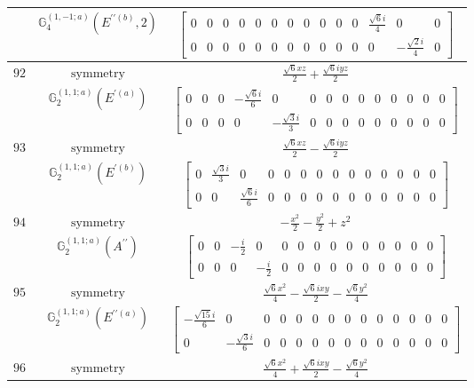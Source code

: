 \documentclass[fleqn,8pt,landscape]{jsarticle}
\begin{document}
\begin{longtable}{ccc}
$  $ & $ \mathbb{G}_{4}^{(1,-1;a)}(E^{\prime\prime(b)},2) $ & $ \begin{bmatrix} 0 & 0 & 0 & 0 & 0 & 0 & 0 & 0 & 0 & 0 & 0 & \frac{\sqrt{6} i}{4} & 0 & 0 \\ 0 & 0 & 0 & 0 & 0 & 0 & 0 & 0 & 0 & 0 & 0 & 0 & - \frac{\sqrt{2} i}{4} & 0 \end{bmatrix} $ \\ \hline
$ 92 $ & $ \text{symmetry} $ & $ \frac{\sqrt{6} x z}{2} + \frac{\sqrt{6} i y z}{2} $ \\
$  $ & $ \mathbb{G}_{2}^{(1,1;a)}(E^{\prime(a)}) $ & $ \begin{bmatrix} 0 & 0 & 0 & - \frac{\sqrt{6} i}{6} & 0 & 0 & 0 & 0 & 0 & 0 & 0 & 0 & 0 & 0 \\ 0 & 0 & 0 & 0 & - \frac{\sqrt{3} i}{3} & 0 & 0 & 0 & 0 & 0 & 0 & 0 & 0 & 0 \end{bmatrix} $ \\ \hline
$ 93 $ & $ \text{symmetry} $ & $ \frac{\sqrt{6} x z}{2} - \frac{\sqrt{6} i y z}{2} $ \\
$  $ & $ \mathbb{G}_{2}^{(1,1;a)}(E^{\prime(b)}) $ & $ \begin{bmatrix} 0 & \frac{\sqrt{3} i}{3} & 0 & 0 & 0 & 0 & 0 & 0 & 0 & 0 & 0 & 0 & 0 & 0 \\ 0 & 0 & \frac{\sqrt{6} i}{6} & 0 & 0 & 0 & 0 & 0 & 0 & 0 & 0 & 0 & 0 & 0 \end{bmatrix} $ \\ \hline
$ 94 $ & $ \text{symmetry} $ & $ - \frac{x^{2}}{2} - \frac{y^{2}}{2} + z^{2} $ \\
$  $ & $ \mathbb{G}_{2}^{(1,1;a)}(A^{\prime\prime}) $ & $ \begin{bmatrix} 0 & 0 & - \frac{i}{2} & 0 & 0 & 0 & 0 & 0 & 0 & 0 & 0 & 0 & 0 & 0 \\ 0 & 0 & 0 & - \frac{i}{2} & 0 & 0 & 0 & 0 & 0 & 0 & 0 & 0 & 0 & 0 \end{bmatrix} $ \\ \hline
$ 95 $ & $ \text{symmetry} $ & $ \frac{\sqrt{6} x^{2}}{4} - \frac{\sqrt{6} i x y}{2} - \frac{\sqrt{6} y^{2}}{4} $ \\
$  $ & $ \mathbb{G}_{2}^{(1,1;a)}(E^{\prime\prime(a)}) $ & $ \begin{bmatrix} - \frac{\sqrt{15} i}{6} & 0 & 0 & 0 & 0 & 0 & 0 & 0 & 0 & 0 & 0 & 0 & 0 & 0 \\ 0 & - \frac{\sqrt{3} i}{6} & 0 & 0 & 0 & 0 & 0 & 0 & 0 & 0 & 0 & 0 & 0 & 0 \end{bmatrix} $ \\ \hline
$ 96 $ & $ \text{symmetry} $ & $ \frac{\sqrt{6} x^{2}}{4} + \frac{\sqrt{6} i x y}{2} - \frac{\sqrt{6} y^{2}}{4} $ \\

\end{longtable}
\end{document}
